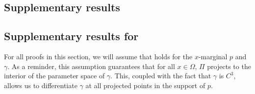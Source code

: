 \documentclass[11pt]{article}
\begin{document}
\begin{appendices}
\section{Supplementary results}


\subsection{Supplementary results for }

For all proofs in this section, we will assume that  holds for the $x$-marginal $p$ and $\gamma$. As a reminder, this assumption guarantees that for all $x \in \Omega$,  $\Pi$ projects to the interior of the parameter space of $\gamma$. This, coupled with the fact that $\gamma$ is $C^3$, allows us to differentiate $\gamma$ at all projected points in the support of $p$.



\end{appendices}
\end{document}
